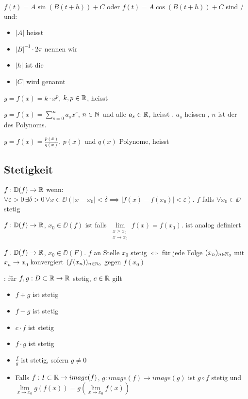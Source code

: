 \Def $f(t) = A \sin(B(t+h)) + C$ oder $f(t) = A\cos(B(t+h))+C$ sind / und:
\vspace{-0.6em}
\begin{itemize}
    \item $|A|$ heisst 
    \item $|B|^{-1} \cdot 2\pi$ nennen wir 
    \item $|h|$ ist die 
    \item $|C|$ wird  genannt
\end{itemize}

\Def $y = f(x) = k\cdot x^p$, $k,p \in \mathbb{R}$, heisst 

\Def $y = f(x) = \sum_{s=0}^{n} a_s x^s$, $n \in \mathbb{N}$ und alle $a_s \in \mathbb{R}$, heisst .
$a_s$ heissen , $n$ ist der  des Polynoms.

\Def $y = f(x) = \frac{p(x)}{q(x)}$, $p(x)$ und $q(x)$ Polynome, heisst 

\subsection{Stetigkeit}

\Def $f: \mathbb{D}(f) \to \mathbb{R}$  wenn:
$\forall \varepsilon > 0 \, \exists \delta > 0 \, \forall x \in \DD (|x - x_0| < \delta \implies |f(x) - f(x_0)| < \varepsilon)$.
$f$  falls $\forall x_0 \in \DD$ stetig

\Def $f: \mathbb{D}(f) \to \mathbb{R}$, $x_0 \in \DD(f)$ ist  falls
$\lim\limits_{\substack{x\ge x_0 \\ x \to x_0}} f(x) = f(x_0)$.
 ist analog definiert

\Satz $f: \mathbb{D}(f) \to \mathbb{R}$, $x_0 \in \DD(F)$. $f$ an Stelle $x_0$ stetig $\iff$
für jede Folge $(x_n)_{n\in\mathbb{N}_0}$ mit $x_n \to x_0$ konvergiert $(f(x_n))_{n\in\mathbb{N}_0}$ gegen $f(x_0)$

\Satz {}: für $f,g: D \subset \mathbb{R} \to \mathbb{R}$ stetig, $c \in \mathbb{R}$ gilt
\vspace{-0.6em}
\begin{itemize}
    \item $f + g$ ist stetig
    \item $f - g$ ist stetig
    \item $c \cdot f$ ist stetig
    \item $f \cdot g$ ist stetig
    \item $\frac{f}{g}$ ist stetig, sofern $g \ne 0$
    \item Falls $f: I \subset \mathbb{R} \to image(f)$, $g: image(f) \to image(g)$ ist
    $g \circ f$ stetig und $\lim\limits_{x\to x_0} g(f(x)) = g(\lim\limits_{x \to x_0}f(x))$
\end{itemize}

